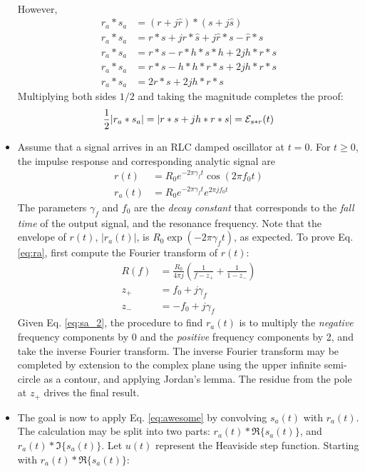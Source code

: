 \documentclass[amsmath,amssymb,aps,prd,10pt,twocolumn,showkeys]{revtex4}
\begin{document}
\begin{itemize}
\begin{align}
\end{align}
However,
\begin{align}
r_a * s_a &= (r + j \hat{r}) * (s + j \hat{s}) \\
r_a * s_a &= r * s + j r * \hat{s} + j \hat{r} * s - \hat{r} * \hat{s} \\
r_a * s_a &= r * s - r * h * s * h + 2 j h * r * s \\
r_a * s_a &= r * s - h * h * r * s + 2 j h * r * s \\
r_a * s_a &= 2 r * s + 2 j h * r * s
\end{align}
Multiplying both sides $1/2$ and taking the magnitude completes the proof:
\begin{equation}
\frac{1}{2} |r_a * s_a| = |r * s + j h * r * s| = \mathcal{E}_{s * r}(t) \\
\end{equation}
\item Assume that a signal arrives in an RLC damped oscillator at $t=0$.  For $t\geq 0$, the impulse response and corresponding analytic signal are
\begin{align}
r(t) &= R_0 e^{-2 \pi \gamma_f t} \cos(2\pi f_0 t) \label{eq:r} \\
r_a(t) &= R_0 e^{-2 \pi \gamma_f t} e^{2\pi j f_0 t} \label{eq:ra}
\end{align}
The parameters $\gamma_f$ and $f_0$ are the \textit{decay constant} that corresponds to the \textit{fall time} of the output signal, and the resonance frequency.  Note that the envelope of $r(t)$, $|r_a(t)|$, is $R_0 \exp(-2 \pi \gamma_f t)$, as expected.  To prove Eq. \ref{eq:ra}, first compute the Fourier transform of $r(t)$:
\begin{align}
R(f) &= \frac{R_0}{4\pi j} \left( \frac{1}{f - z_{+}} + \frac{1}{1- z_{-}} \right) \\
z_{+} &= f_0 + j \gamma_f \\
z_{-} &= -f_0 + j \gamma_f
\end{align}
Given Eq. \ref{eq:sa_2}, the procedure to find $r_a(t)$ is to multiply the \textit{negative} frequency components by 0 and the \textit{positive} frequency components by 2, and take the inverse Fourier transform.  The inverse Fourier transform may be completed by extension to the complex plane using the upper infinite semi-circle as a contour, and applying Jordan's lemma.  The residue from the pole at $z_{+}$ drives the final result.
\item The goal is now to apply Eq. \ref{eq:awesome} by convolving $s_a(t)$ with $r_a(t)$.  The calculation may be split into two parts: $r_a(t) * \Re\lbrace s_a(t) \rbrace$, and $r_a(t) * \Im\lbrace s_a(t) \rbrace$.  Let $u(t)$ represent the Heaviside step function.  Starting with $r_a(t) * \Re\lbrace s_a(t) \rbrace$:

\end{itemize}
\end{document}
